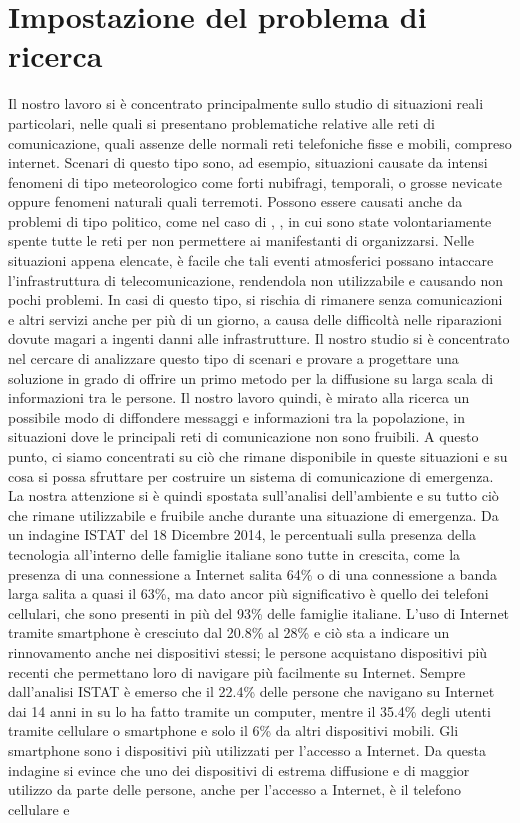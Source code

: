 \chapter{Impostazione del problema di ricerca}
\label{chap:impost_prob_ricerca}

Il nostro lavoro si è concentrato principalmente sullo studio di situazioni reali particolari, nelle quali si presentano problematiche relative alle reti di comunicazione, quali assenze delle normali reti telefoniche fisse e mobili, compreso internet. Scenari di questo tipo sono, ad esempio, situazioni causate da intensi fenomeni di tipo meteorologico come forti nubifragi, temporali, o grosse nevicate oppure fenomeni naturali quali terremoti. Possono essere causati anche da problemi di tipo politico, come nel caso di \cite{wemakehistory2014-articolo}, \cite{wemakehistory2014-fattoq}, \cite{wemakehistory2014-lastampa} in cui sono state volontariamente spente tutte le reti per non permettere ai manifestanti di organizzarsi. Nelle situazioni appena elencate, è facile che tali eventi atmosferici possano intaccare l'infrastruttura di telecomunicazione, rendendola non utilizzabile e causando non pochi problemi. In casi di questo tipo, si rischia di rimanere senza comunicazioni e altri servizi anche per più di un giorno, a causa delle difficoltà nelle riparazioni dovute magari a ingenti danni alle infrastrutture. Il nostro studio si è concentrato nel cercare di analizzare questo tipo di scenari e provare a progettare una soluzione in grado di offrire un primo metodo per la diffusione su larga scala di informazioni tra le persone. Il nostro lavoro quindi, è mirato alla ricerca un possibile modo di diffondere messaggi e informazioni tra la popolazione, in situazioni dove le principali reti di comunicazione non sono fruibili. A questo punto, ci siamo concentrati su ciò che rimane disponibile in queste situazioni e su cosa si possa sfruttare per costruire un sistema di comunicazione di emergenza. La nostra attenzione si è quindi spostata sull'analisi dell'ambiente e su tutto ciò che rimane utilizzabile e fruibile anche durante una situazione di emergenza. Da un indagine ISTAT \cite{istat2014} del 18 Dicembre 2014, le percentuali sulla presenza della tecnologia all'interno delle famiglie italiane sono tutte in crescita, come la presenza di una connessione a Internet salita 64\% o di una connessione a banda larga salita a quasi il 63\%, ma dato ancor più significativo è quello dei telefoni cellulari, che sono presenti in più del 93\% delle famiglie italiane. L'uso di Internet tramite smartphone è cresciuto dal 20.8\% al 28\% e ciò sta a indicare un rinnovamento anche nei dispositivi stessi; le persone acquistano dispositivi più recenti che permettano loro di navigare più facilmente su Internet. Sempre dall'analisi ISTAT è emerso che il 22.4\% delle persone che navigano su Internet dai 14 anni in su lo ha fatto tramite un computer, mentre il 35.4\% degli utenti tramite cellulare o smartphone e solo il 6\% da altri dispositivi mobili. Gli smartphone sono i dispositivi più utilizzati per l'accesso a Internet. Da questa indagine si evince che uno dei dispositivi di estrema diffusione e di maggior utilizzo da parte delle persone, anche per l'accesso a Internet, è il telefono cellulare e 